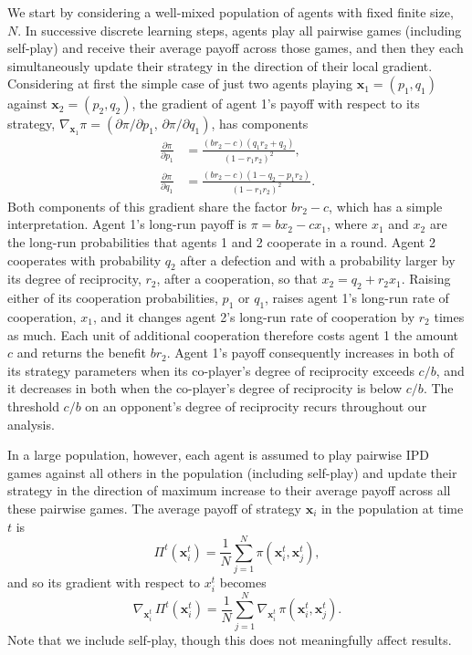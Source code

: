 \documentclass[10pt]{article}
\begin{document}
We start by considering a well-mixed population of agents with fixed finite size, $N$. In successive discrete learning steps, agents play all pairwise games (including self-play) and receive their average payoff across those games, and then they each simultaneously update their strategy in the direction of their local gradient. Considering at first the simple case of just two agents playing $\mathbf{x}_1 = (p_1, q_1)$  against $\mathbf{x}_2 = (p_2, q_2)$, the gradient of agent 1's payoff with respect to its strategy, $\nabla_{\mathbf{x}_1}\pi = (\partial \pi/\partial p_1,\, \partial\pi/\partial q_1)$, has components
\begin{align}
\frac{\partial \pi}{\partial p_1} &= \frac{(b r_2 - c)(q_1 r_2 + q_2)}{(1 - r_1 r_2)^2}, \\
\frac{\partial \pi}{\partial q_1} &= \frac{(b r_2 - c)(1 - q_2 - p_1 r_2)}{(1 - r_1 r_2)^2}.
\end{align}
Both components of this gradient share the factor $b r_2 - c$, which has a simple interpretation. Agent 1's long-run payoff is $\pi = b x_2 - c x_1$, where $x_1$ and $x_2$ are the long-run probabilities that agents 1 and 2 cooperate in a round. Agent 2 cooperates with probability $q_2$ after a defection and with a probability larger by its degree of reciprocity, $r_2$, after a cooperation, so that $x_2 = q_2 + r_2 x_1$. Raising either of its cooperation probabilities, $p_1$ or $q_1$, raises agent 1's long-run rate of cooperation, $x_1$, and it changes agent 2's long-run rate of cooperation by $r_2$ times as much. Each unit of additional cooperation therefore costs agent 1 the amount $c$ and returns the benefit $b r_2$. Agent 1's payoff consequently increases in both of its strategy parameters when its co-player's degree of reciprocity exceeds $c/b$, and it decreases in both when the co-player's degree of reciprocity is below $c/b$. The threshold $c/b$ on an opponent's degree of reciprocity recurs throughout our analysis.

In a large population, however, each agent is assumed to play pairwise IPD games against all others in the population (including self-play) and update their strategy in the direction of maximum increase to their average payoff across all these pairwise games. The average payoff of strategy $\mathbf{x}_i$ in the population at time $t$ is
\[
\Pi^t(\mathbf{x}_i^t) = \frac{1}{N}\sum_{j=1}^N \pi(\mathbf{x}_i^t, \mathbf{x}_j^t),
\]
and so its gradient with respect to $x_i^t$ becomes
\[
\nabla_{\mathbf{x}_i^t} \, \Pi^t(\mathbf{x}_i^t) = \frac{1}{N} \sum_{j=1}^N \nabla_{\mathbf{x}_i^t} \, \pi(\mathbf{x}_i^t, \mathbf{x}_j^t).
\]
Note that we include self-play, though this does not meaningfully affect results.
\end{document}
